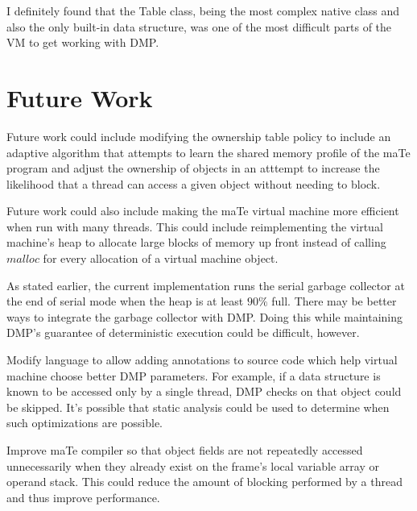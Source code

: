 
I definitely found that the Table class, being the most complex native
class and also the only built-in data structure, was one of the most
difficult parts of the VM to get working with DMP.

\section{Future Work}

Future work could include modifying the ownership table policy to
include an adaptive algorithm that attempts to learn the shared memory
profile of the maTe program and adjust the ownership of objects in an
atttempt to increase the likelihood that a thread can access a given
object without needing to block.

Future work could also include making the maTe virtual machine more
efficient when run with many threads.  This could include
reimplementing the virtual machine's heap to allocate large blocks of
memory up front instead of calling $malloc$ for every allocation of a
virtual machine object.

As stated earlier, the current implementation runs the serial garbage
collector at the end of serial mode when the heap is at least $90\%$
full.  There may be better ways to integrate the garbage collector
with DMP.  Doing this while maintaining DMP's guarantee of
deterministic execution could be difficult, however.

Modify language to allow adding annotations to source code which help
virtual machine choose better DMP parameters.  For example, if a data
structure is known to be accessed only by a single thread, DMP checks
on that object could be skipped.  It's possible that static analysis
could be used to determine when such optimizations are possible.

Improve maTe compiler so that object fields are not repeatedly
accessed unnecessarily when they already exist on the frame's local
variable array or operand stack.  This could reduce the amount of
blocking performed by a thread and thus improve performance.


